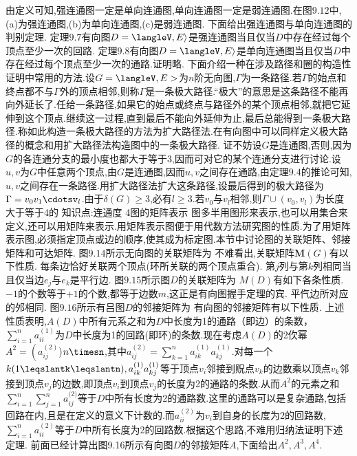由定义可知,强连通图一定是单向连通图,单向连通图一定是弱连通图.在图$9.12$中,(a)为强连通图,(b)为单向连通图,(c)是弱连通图.
下面给出强连通图与单向连通图的判别定理.
定理$9.7$有向图$D=\langleV,E\rangle$是强连通图当且仅当$D$中存在经过每个顶点至少一次的回路.
定理$9.8$有向图$D=\langleV,E\rangle$是单向连通图当且仅当$D$中存在经过每个顶点至少一次的通路.证明略.
下面介绍一种在涉及路径和圈的构造性证明中常用的方法.设$G=\langleV,E>$为$n$阶无向图,$\Gamma$为一条路径.若$\Gamma$的始点和终点都不与$\Gamma$外的顶点相邻,则称$\Gamma$是一条极大路径.“极大”的意思是这条路径不能再向外延长了.任给一条路径,如果它的始点或终点与路径外的某个顶点相邻,就把它延伸到这个顶点.继续这一过程,直到最后不能向外延伸为止,最后总能得到一条极大路径.称如此构造一条极大路径的方法为扩大路径法.在有向图中可以同样定义极大路径的概念和用扩大路径法构造图中的一条极大路径.
证不妨设$G$是连通图,否则,因为$G$的各连通分支的最小度也都大于等于3,因而可对它的某个连通分支进行讨论.设$u,v$为$G$中任意两个顶点,由$G$是连通图,因而$u,v$之间存在通路,由定理$9.4$的推论可知,$u,v$之间存在一条路径.用扩大路径法扩大这条路径,设最后得到的极大路径为$\Gamma=v_{0}v_{1}\cdotsv_{l}$.由于$\delta(G)\geqslant3$,必有$l\geqslant3$.若$v_{0}$与$v_{l}$相邻,则$\Gamma\cup\left(v_{0},v_{l}\right)$为长度大于等于4的
知识点:连通度
{4图的矩阵表示}
图多半用图形来表示,也可以用集合来定义,还可以用矩阵来表示.用矩阵表示图便于用代数方法研究图的性质.为了用矩阵表示图,必须指定顶点或边的顺序,使其成为标定图.本节中讨论图的关联矩阵、邻接矩阵和可达矩阵.
图$9.14$所示无向图的关联矩阵为
不难看出,关联矩阵$\boldsymbol{M}(G)$有以下性质.
每条边恰好关联两个顶点(环所关联的两个顶点重合).
第$j$列与第$k$列相同当且仅当边$e_{j}$与$e_{k}$是平行边.
图$9.15$所示图$D$的关联矩阵为
$M(D)$有如下各条性质.
$-1$的个数等于$+1$的个数,都等于边数$m$,这正是有向图握手定理的宾.
平㐹边所对应的邜相同.
图$9.16$所示有吕图$D$的邻接矩阵为
有向图的邻接矩阵有以下性质.
上述性质表明,$A(D)$中所有元系之和为$D$中长度为1的通路（即边）的条数，$\sum_{i=1}^{n}a_{ii}^{(1)}$为$D$中长度为1的回路(即环)的条数.现在考虑$A(D)$的2㐸幂$A^{2}=\left(a_{ij}^{(2)}\right.$)$n\timesn$,其中$a_{ij}^{(2)}=\sum_{k=1}^{n}a_{ik}^{(1)}a_{kj}^{(1)}$.对每一个$k(1\leqslantk\leqslantn),a_{ik}^{(1)}a_{kj}^{(1)}$等于顶点$v_{i}$邻接到贶点$v_{k}$的边数乘以顶点$v_{k}$邻接到顶点$v_{j}$的边数,即顶点$v_{i}$到顶点$v_{j}$的长度为2的通路的条数.从而$A^{2}$的元素之和$\sum_{i=1}^{n}\sum_{j=1}^{n}a_{ij}^{\text{(2)}}$等于$D$中所有长度为2的通路数.这里的通路可以是复杂通路,包括回路在内,且是在定义的意义下计数的.而$a_{ii}^{(2)}$为$v_{i}$到自身的长度为2的回路数,$\sum_{i=1}^{n}a_{ii}^{(2)}$等于$D$中所有长度为2的回路数.根据这个思路,不难用归纳法证明下述定理.
前面已经计算出图9.16所示有向图$D$的邻接矩阵$A$,下面给出$A^{2},A^{3},A^{4}$.
